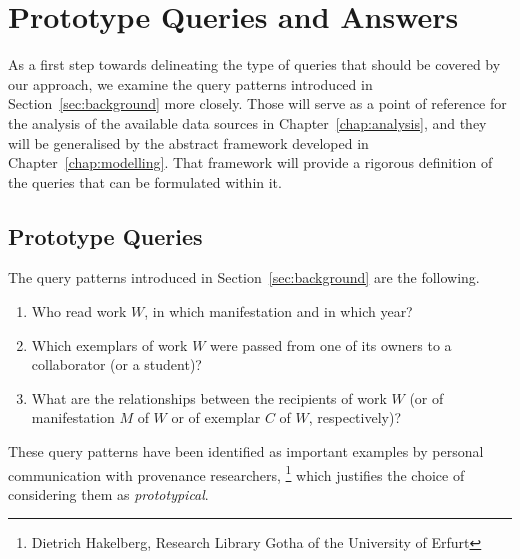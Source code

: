 \chapter{Prototype Queries and Answers}
\label{chap:prototype_queries}

As a first step towards delineating the type of queries that should be covered by our approach,
we examine the query patterns introduced in Section~\ref{sec:background} more closely.
Those will serve as a point of reference for the analysis of the available data sources
in Chapter~\ref{chap:analysis},
and they will be generalised by the abstract framework developed in Chapter~\ref{chap:modelling}.
That framework will provide a rigorous definition of the queries that can be formulated
within it.

\section{Prototype Queries}
\label{sec:prototype_queries}

The query patterns introduced in Section~\ref{sec:background} are the following.
%
\begin{enumerate}
  \item[\exaquery{1}]
    Who read work $W$, in which manifestation and in which year?
  \item[\exaquery{2}]
    Which exemplars of work $W$ were passed from one of its owners to a collaborator (or a student)?
  \item[\exaquery{3}]
    What are the relationships between the recipients of work $W$
    (or of manifestation $M$ of $W$ or of exemplar $C$ of $W$, respectively)?
\end{enumerate}
%
These query patterns have been identified
as important examples by personal communication
with provenance researchers,%
\footnote{Dietrich Hakelberg, Research Library Gotha of the University of Erfurt}
which justifies the choice of considering them as \emph{prototypical}.

